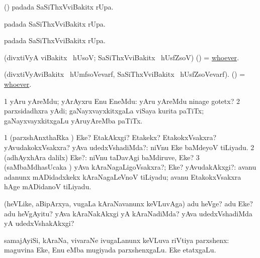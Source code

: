 \bentry
{}
\gl{\sanA}
\bmng
(\pArxparx)  padada SaSiThxVviBakitx rUpa. 
\emng
\eentry

\bentry
{}
\gl{\sanA}
\bmng
{} padada SaSiThxVviBakitx rUpa. 
\emng
\eentry

\bentry
{}
\gl{\sanA}
\bmng
{} padada SaSiThxVviBakitx rUpa. 
\emng
\eentry

\bentry
{}
\gl{\sanA} 
\bmng
(divxtiVyA viBakitx  \ucAcx\ hUsoV; SaSiThxVviBakitx  \ucAcx\ hUsfZsoV) (\pArxparx) = \hyperlink{whoever}{whoever}. 
\emng
\eentry

\bentry
{}
\gl{\sanA}
\bmng
(divxtiVyAviBakitx  \ucAcx\ hUmfsoVevarf, SaSiThxVviBakitx  \ucAcx\ hUsfZsoVevarf). (\pArxparx) = \hyperlink{whoever}{whoever}. 
\emng
\eentry

\bentry
{}
\gl{\nA}
\bmng
\bnum
\num{1} yAru yAreMdu; yArAyxru Enu EneMdu:  yAru yAreMdu ninage gotetx? 
\num{2} parxsidadhxra yAdi; gaNayxvayxkitxgaLa viSaya kurita paTiTx; gaNayxvayxkitxgaLu yAruyAreMba paTiTx. 
\enum
\emng
\eentry

\bentry
{} 
\gl{\kirxvi}
\expl{}
\bmng
\bnum
\num{1} (parxshAnxthaRka \kirxvi) Eke? EtakAkxgi? Etakekx? EtakokxVsakxra? yAvudakokxVsakxra? yAva udedxVshadiMda?:  niVnu Eke baMdeyoV tiLiyadu. 
\num{2} (adhAyxhAra \parx dalilx) Eke?:  niVnu taDavAgi baMdiruve, Eke? 
\num{3} (saMbaMdhasUcaka \kirxvi) yAva kAraNagaLigoVsakxra?; Eke? yAvudakAkxgi?:  avanu adanunx mADidadxkekx kAraNagaLeVnoV tiLiyadu; avanu EtakokxVsakxra hAge mADidanoV tiLiyadu. 
\enum
\emng

\noindent 
\gl{\pagu}
\bmng
{} (heVLike, aBipArxya, \mo vugaLa kAraNavanunx keVLuvAga) adu heVge? adu Eke? adu heVgAyitu? yAva kAraNakAkxgi yA kAraNadiMda? yAva udedxVshadiMda yA udedxVshakAkxgi? 
\emng
\eentry

\bentry
{} 
\gl{\nA}
\bmng
 samajAyiSi, kAraNa, vivaraNe ivugaLanunx keVLuva riVtiya parxshenx:  maguvina Eke, Enu eMba mugiyada parxshenxgaLu.  Eke etatxgaLu. 
\emng
\eentry

